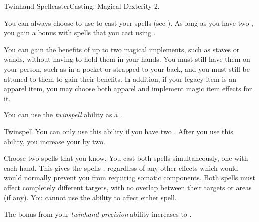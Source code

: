     \begin{magicalfeat}{Twinhand Spellcaster}{Casting, Magical}
        \featpre Dexterity 2.

         You can always choose to use  to cast your spells (see ).
        As long as you have two , you gain a   bonus with spells that you cast using .

         You can gain the benefits of up to two magical implements, such as staves or wands, without having to hold them in your hands.
        You must still have them on your person, such as in a pocket or strapped to your back, and you must still be attuned to them to gain their benefits.
        In addition, if your legacy item is an apparel item, you may choose both apparel and implement magic item effects for it.

         You can use the \textit{twinspell} ability as a .
        \begin{magicalactiveability}{Twinspell}
            \rankline
            You can only use this ability if you have two .
            After you use this ability, you increase your  by two.

            Choose two spells that you know.
            You cast both spells simultaneously, one with each hand.
            This gives the spells , regardless of any other effects which would would normally prevent you from requiring somatic components.
            Both spells must affect completely different targets, with no overlap between their targets or areas (if any).
            You cannot use the  ability to affect either spell.
        \end{magicalactiveability}

         The bonus from your \textit{twinhand precision} ability increases to .
    \end{magicalfeat}

